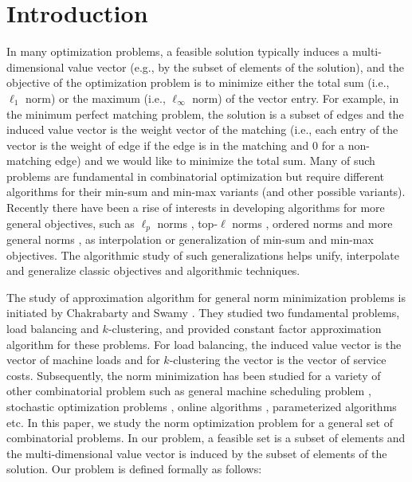 \documentclass[11pt,a4paper]{article} \usepackage{enumitem}
\theoremstyle{definition}
\begin{document}



\section{Introduction}
\label{sec:intro}


In many optimization problems, a feasible solution typically induces a multi-dimensional value vector (e.g., by the subset of elements of the solution), 
and the objective of the optimization problem is to minimize either the total sum (i.e., $\ell_1$ norm) or the maximum (i.e., $\ell_\infty$ norm) of the vector entry.
For example, in the minimum perfect matching problem, the solution is a subset of edges and the induced value vector is the weight vector of the matching (i.e., each entry of the vector is the weight of edge if the edge is in the matching and 0 for a non-matching edge) and we would like to minimize the total sum. 
Many of such problems are fundamental in combinatorial optimization but require different algorithms for their min-sum and min-max variants
(and other possible variants).
Recently there have been a rise of interests in developing algorithms for more general objectives, such as $\ell_p$ norms \cite{azar2005convex,golovin2008all}, top-$\ell$ norms \cite{maalouly2022exact}, ordered norms \cite{byrka2018constant,chakrabarty2018interpolating} and more general norms
\cite{chakrabarty2019approximation,chakrabarty2019simpler,ibrahimpur2020approximation,deng2022generalized,abbasi2023parameterized,kesselheim2024supermodular}, as interpolation or generalization of min-sum and min-max objectives. The algorithmic study of such generalizations helps unify, interpolate and generalize classic objectives and algorithmic
techniques. 

The study of approximation algorithm for general norm minimization problems is initiated by Chakrabarty and Swamy \cite{chakrabarty2019approximation}. They studied two fundamental problems, load balancing and $k$-clustering, and provided constant factor approximation algorithm for these problems. For load balancing, the induced value vector is the vector of machine loads and for 
$k$-clustering the vector is the vector of service costs.
Subsequently, the norm minimization has been studied for a variety of other combinatorial problem
such as general machine scheduling problem \cite{deng2022generalized}, stochastic optimization problems \cite{ibrahimpur2020approximation}, 
online algorithms 
\cite{patton2023submodular},
parameterized algorithms \cite{abbasi2023parameterized} etc.
In this paper, we study the norm optimization problem for a general set of combinatorial problems.
In our problem, a feasible set is a subset of elements
and the multi-dimensional value vector is induced by the subset of elements of the solution.
Our problem is defined formally as follows:
\end{document}
